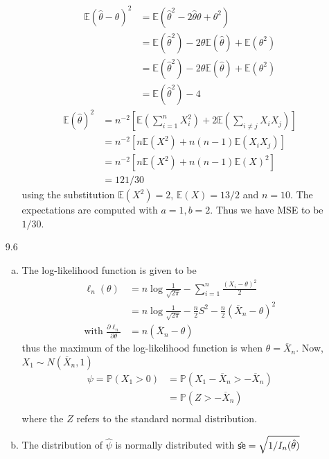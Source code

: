 \documentclass[a4paper,10pt]{article}
\theoremstyle{definition}
\begin{document}
\begin{enumerate}
\begin{enumerate}[(a)]
\begin{align*}
\mathbb{E}(\hat{\theta}-\theta)^2&=\mathbb{E}(\hat{\theta}^2-2\hat{\theta}\theta+\theta^2)\\
&=\mathbb{E}(\hat{\theta}^2)-2\theta\mathbb{E}(\hat{\theta})+\mathbb{E}(\theta^2)\\
&=\mathbb{E}(\hat{\theta}^2)-2\theta\mathbb{E}(\hat{\theta})+\mathbb{E}(\theta^2)\\
&=\mathbb{E}(\hat{\theta}^2)-4
\end{align*}
\begin{align*}
\mathbb{E}(\hat{\theta})^2&=n^{-2}\left[\mathbb{E}\left(\sum_{i=1}^{n}X_i^2\right)+2\mathbb{E}\left(\sum_{i\neq j}X_iX_j\right)\right]\\
&=n^{-2}\left[n\mathbb{E}\left(X^2\right)+n(n-1)\mathbb{E}\left(X_iX_j\right)\right]\\
&=n^{-2}\left[n\mathbb{E}\left(X^2\right)+n(n-1)\mathbb{E}\left(X\right)^2\right]\\
&=121/30
\end{align*}
using the substitution $\mathbb{E}(X^2) = 2 $, $\mathbb{E}(X) = 13/2$ and $n=10$. The expectations are computed with $a=1, b=2$. Thus we have {\sffamily MSE} to be $1/30$.
\end{enumerate}
\item[9.6] 
\begin{enumerate}[(a)]
\item The log-likelihood function is given to be
\begin{align*}
\ell_n(\theta)&=n\log\frac{1}{\sqrt{2\pi}}-\sum_{i=1}^{n}\frac{(X_i-\theta)^2}{2}\\
&=n\log\frac{1}{\sqrt{2\pi}}-\frac{n}{2}S^2-\frac{n}{2}(\overline{X}_n-\theta)^2\\
\text{with } \frac{\partial \ell_n}{\partial \theta}&=n(\overline{X}_n-\theta)
\end{align*}
thus the maximum of the log-likelihood function is when $\theta = \overline{X}_n$. Now, $X_1 \sim N(\overline{X}_n,1)$
\begin{align*}
\psi = \mathbb{P}(X_1 >0) &= \mathbb{P}\left(X_1 -\overline{X}_n > -\overline{X}_n\right)\\
&= \mathbb{P}\left( Z> -\overline{X}_n\right)\\
\end{align*}
where the $Z$ refers to the standard normal distribution.
\item The distribution of $\hat{\psi}$ is normally distributed with $\hat{\text{\sffamily se}} = \sqrt{1/I_n(\hat{\theta})}$

\end{enumerate}
\end{enumerate}
\end{document}
